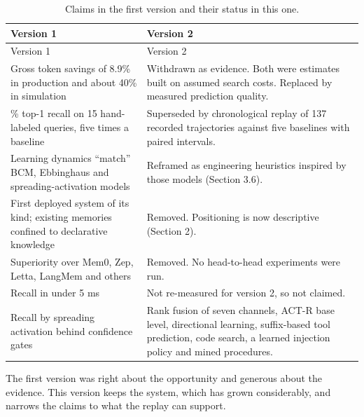 \documentclass[
  american,
  11pt,
]{article}
\begin{document}
\begin{longtable}[]{@{}
  >{\raggedright\arraybackslash}p{}
  >{\raggedright\arraybackslash}p{}@{}}
\caption{Claims in the first version and their status in this one.}\tabularnewline
\toprule\noalign{}
\begin{minipage}[b]{\linewidth}\raggedright
Version 1
\end{minipage} & \begin{minipage}[b]{\linewidth}\raggedright
Version 2
\end{minipage} \\
\midrule\noalign{}
\endfirsthead
\toprule\noalign{}
\begin{minipage}[b]{\linewidth}\raggedright
Version 1
\end{minipage} & \begin{minipage}[b]{\linewidth}\raggedright
Version 2
\end{minipage} \\
\midrule\noalign{}
\endhead
\bottomrule\noalign{}
\endlastfoot
Gross token savings of 8.9\% in production and about 40\% in simulation & Withdrawn as evidence. Both were
estimates built on assumed search costs. Replaced by measured prediction quality. \\
67\% top-1 recall on 15 hand-labeled queries, five times a baseline & Superseded by chronological replay of
137 recorded trajectories against five baselines with paired intervals. \\
Learning dynamics ``match'' BCM, Ebbinghaus and spreading-activation models & Reframed as engineering
heuristics inspired by those models (Section 3.6). \\
First deployed system of its kind; existing memories confined to declarative knowledge & Removed. Positioning
is now descriptive (Section 2). \\
Superiority over Mem0, Zep, Letta, LangMem and others & Removed. No head-to-head experiments were run. \\
Recall in under 5 ms & Not re-measured for version 2, so not claimed. \\
Recall by spreading activation behind confidence gates & Rank fusion of seven channels, ACT-R base level,
directional learning, suffix-based tool prediction, code search, a learned injection policy and mined
procedures. \\
\end{longtable}

The first version was right about the opportunity and generous about the evidence. This version keeps the
system, which has grown considerably, and narrows the claims to what the replay can support.
\end{document}
